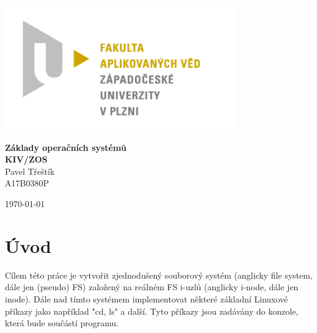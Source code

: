 \documentclass[12pt]{report}
\begin{document}
%

\begin{titlepage}
\centerline{\includegraphics[width=10cm]{img/logo.jpg}}
\begin{center}
\vspace{30px}
{\huge
\textbf{Základy operačních systémů}\\
\vspace{1cm}
}
{\large
\textbf{KIV/ZOS}\\
\vspace{1cm}
}
\vspace{1cm}
{\large
Pavel Třeštík\\
}
{\normalsize
A17B0380P
}
\end{center}
\vspace{\fill}
\hfill
\begin{minipage}[t]{7cm}
\flushright
\today
\end{minipage}
\end{titlepage}


\tableofcontents



\chapter{Úvod}
Cílem této práce je vytvořit zjednodušený souborový systém (anglicky file system, dále jen (pseudo) FS) založený
na reálném FS i-uzlů (anglicky i-node, dále jen inode). Dále nad tímto systémem implementovat některé
základní Linuxové příkazy jako například "cd, ls" a další. Tyto příkazy jsou zadávány do konzole, která 
bude součástí programu.
\end{document}
